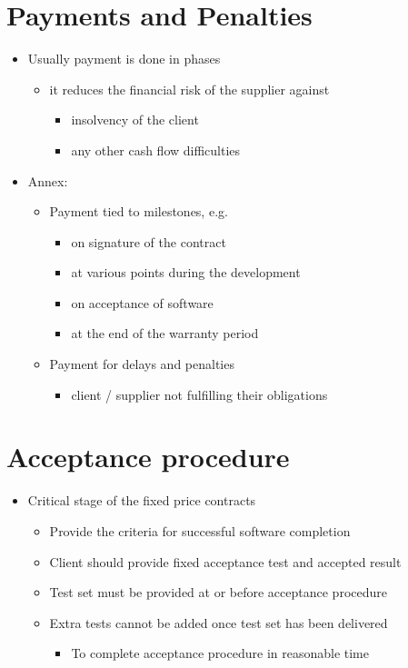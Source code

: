 \documentclass{article}
\begin{document}
\section{Payments and Penalties}
\begin{itemize}
\item Usually payment is done in phases
\begin{itemize}
\item it reduces the financial risk of the supplier against
\begin{itemize}
\item insolvency of the client
\item any other cash flow difficulties
\end{itemize}
\end{itemize}
\item Annex:
\begin{itemize}
\item Payment tied to milestones, e.g.
\begin{itemize}
\item on signature of the contract
\item at various points during the development
\item on acceptance of software
\item at the end of the warranty period
\end{itemize}
\item Payment for delays and penalties
\begin{itemize}
\item client / supplier not fulfilling their obligations
\end{itemize}
\end{itemize}
\end{itemize}



\section{Acceptance procedure}
\begin{itemize}
\item Critical stage of the fixed price contracts
\begin{itemize}
\item Provide the criteria for successful software completion
\item Client should provide fixed acceptance test and accepted result
\item Test set must be provided at or before acceptance procedure
\item Extra tests cannot be added once test set has been delivered
\begin{itemize}
\item To complete acceptance procedure in reasonable time
\end{itemize}
\end{itemize}
\end{itemize}
\end{document}
